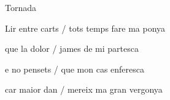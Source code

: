\documentclass[12pt]{article}
\begin{document}
\begin{estrofaExtra}%




\begin{tornada}

Tornada

\end{tornada}


\end{estrofaExtra}


\begin{estrofa}

 Lir entre carts / tots temps fare ma ponya

 que la dolor / james de mi partesca

 e no pensets / que mon cas enferesca

 car maior dan / mereix ma gran vergonya

\end{estrofa}
\end{document}
